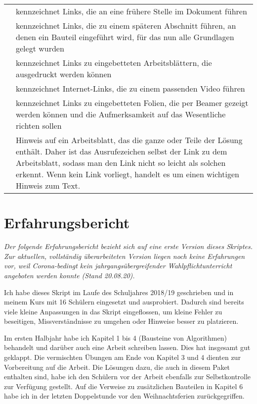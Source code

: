 \medskip
\begin{minipage}{\textwidth}
	\extrarowsep=3mm
	\begin{tabu} to \textwidth {X[l]X[l8]} 
		\zurueck & kennzeichnet Links, die an eine frühere Stelle im Dokument führen \\ 
		\werkzeug & kennzeichnet Links, die zu einem späteren Abschnitt führen, an denen ein Bauteil eingeführt wird, für das nun alle Grundlagen gelegt wurden \\ 
		\drucker & kennzeichnet Links zu eingebetteten Arbeitsblättern, die ausgedruckt werden können \\ 
		\video & kennzeichnet Internet-Links, die zu einem passenden Video führen \\ 
		\folie & kennzeichnet Links zu eingebetteten Folien, die per Beamer gezeigt werden können und die Aufmerksamkeit auf das Wesentliche richten sollen\\
		\ausrufezeichen & Hinweis auf ein Arbeitsblatt, das die ganze oder Teile der Lösung enthält. Daher ist das Ausrufezeichen selbst der Link zu dem Arbeitsblatt, sodass man den Link nicht so leicht als solchen erkennt. Wenn kein Link vorliegt, handelt es um einen wichtigen Hinweis zum Text. \\ 
	\end{tabu}
\end{minipage}


\section{Erfahrungsbericht}

\emph{Der folgende Erfahrungsbericht bezieht sich auf eine erste Version dieses Skriptes. Zur aktuellen, vollständig überarbeiteten Version liegen noch keine Erfahrungen vor, weil Corona-bedingt kein jahrgangsübergreifender Wahlpflichtunterricht angeboten werden konnte (Stand 20.08.20).}

Ich habe dieses Skript im Laufe des Schuljahres 2018/19 geschrieben und in meinem Kurs mit 16 Schülern eingesetzt und ausprobiert. Dadurch sind bereits viele kleine Anpassungen in das Skript eingeflossen, um kleine Fehler zu beseitigen, Missverständnisse zu umgehen oder Hinweise besser zu platzieren.

Im ersten Halbjahr habe ich Kapitel 1 bis 4 (Bausteine von Algorithmen) behandelt und darüber auch eine Arbeit schreiben lassen. Dies hat insgesamt gut geklappt. Die vermischten Übungen am Ende von Kapitel 3 und 4 dienten zur Vorbereitung auf die Arbeit. Die Lösungen dazu, die auch in diesem Paket enthalten sind, habe ich den Schülern vor der Arbeit ebenfalls zur Selbstkontrolle zur Verfügung gestellt. Auf die Verweise zu zusätzlichen Bauteilen in Kapitel 6 habe ich in der letzten Doppelstunde vor den Weihnachtsferien zurückgegriffen.

